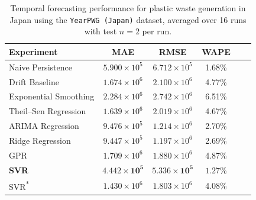 \begin{table}[!ht]
	\centering
	\caption{\centering Temporal forecasting performance for plastic waste generation in Japan using the \texttt{YearPWG (Japan)} dataset, averaged over 16 runs with test \(n=2\) per run.}
	\begin{tabular}{@{}lccccc@{}}
		\toprule
		\textbf{Experiment}    & \textbf{MAE}                   & \textbf{RMSE}                  & \textbf{WAPE}       \\
		\midrule
		Naive Persistence      & \(5.900 \times 10^5\)          & \(6.712 \times 10^5\)          & 1.68\%              \\
		Drift Baseline         & \(1.674 \times 10^6\)          & \(2.100 \times 10^6\)          & 4.77\%              \\
		Exponential Smoothing  & \(2.284 \times 10^6\)          & \(2.742 \times 10^6\)          & 6.51\%              \\
		Theil--Sen Regression  & \(1.639 \times 10^6\)          & \(2.019 \times 10^6\)          & 4.67\%              \\
		ARIMA Regression       & \(9.476 \times 10^5\)          & \(1.214 \times 10^6\)          & 2.70\%              \\
		Ridge Regression       & \(9.447 \times 10^5\)          & \(1.197 \times 10^6\)          & 2.69\%              \\
		GPR                    & \(1.709 \times 10^6\)          & \(1.880 \times 10^6\)          & 4.87\%              \\
		\textbf{SVR}           & \(\mathbf{4.442 \times 10^5}\) & \(\mathbf{5.336 \times 10^5}\) & \(\mathbf{1.27}\)\% \\
		SVR\textsuperscript{*} & \(1.430 \times 10^6\)          & \(1.803 \times 10^6\)          & 4.08\%              \\
		\hline
	\end{tabular}
	\label{tab:forecasting_japan_pwg_metrics}
\end{table}
